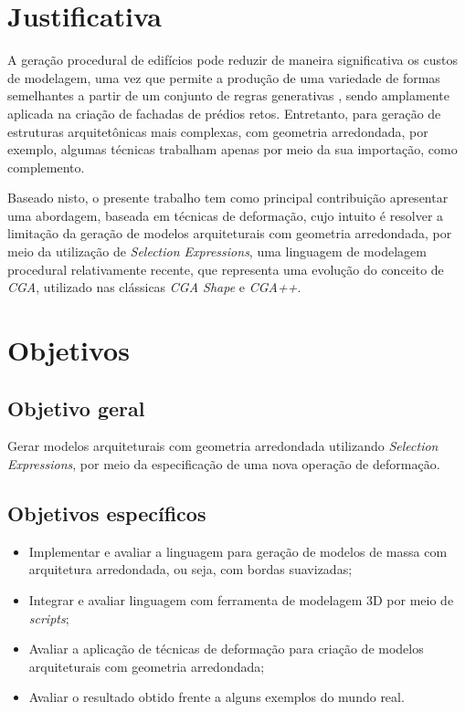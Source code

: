 \section{Justificativa}
\label{sec:justificativa}

A geração procedural de edifícios pode reduzir de maneira significativa os custos de modelagem, uma vez que permite a produção de uma variedade de formas semelhantes a partir de um conjunto de regras generativas \cite{smelik2014}, sendo amplamente aplicada na criação de fachadas de prédios retos. Entretanto, para geração de estruturas arquitetônicas mais complexas, com geometria arredondada, por exemplo, algumas técnicas trabalham apenas por meio da sua importação, como complemento.

Baseado nisto, o presente trabalho tem como principal contribuição apresentar uma abordagem, baseada em técnicas de deformação, cujo intuito é resolver a limitação da geração de modelos arquiteturais com geometria arredondada, por meio da utilização de \textit{Selection Expressions}, uma linguagem de modelagem procedural relativamente recente, que representa uma evolução do conceito de \textit{\gls{CGA}}, utilizado nas clássicas \textit{CGA Shape} e \textit{CGA++}.

\section{Objetivos}
\label{sec:objetivos}

\subsection{Objetivo geral}
\label{sec:objetivos_gerais}

Gerar modelos arquiteturais com geometria arredondada utilizando \textit{Selection Expressions}, por meio da especificação de uma nova operação de deformação.

\subsection{Objetivos específicos}
\label{sec:objetivos_especificos}

\begin{itemize}
    \item Implementar e avaliar a linguagem para geração de modelos de massa com arquitetura arredondada, ou seja, com bordas suavizadas;
    \item Integrar e avaliar linguagem com ferramenta de modelagem 3D por meio de \textit{scripts};
    \item Avaliar a aplicação de técnicas de deformação para criação de modelos arquiteturais com geometria arredondada;
    \item Avaliar o resultado obtido frente a alguns exemplos do mundo real.
\end{itemize}

